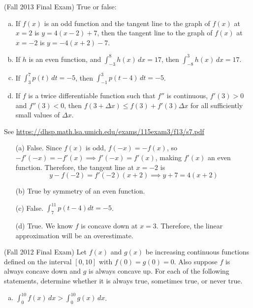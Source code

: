 \documentclass[11pt]{exam}
\begin{document}
\begin{questions}
\begin{solution}
\end{solution}
\question (Fall 2013 Final Exam) %
True or false:
\begin{enumerate}[(a)]
\item If $f(x)$ is an odd function and the tangent line to the graph of $f(x)$ at $x = 2$ is $y = 4(x-2)+7$, then the tangent line to the graph of $f(x)$ at $x = -2$ is $y = -4(x+2)-7$.
\item If $h$ is an even function, and $\displaystyle\int_{-3}^8 h(x) \, dx=17$, then $\int_{-8}^3 h(x) \, dx=17$.
\item If $\int_{3}^7 p(t) \, dt=-5$, then $\displaystyle\int_{-1}^3 p(t-4) \, dt=-5$.
\item If $f$ is a twice differentiable function such that $f''$ is continuous, $f'(3)>0$ and $f''(3)<0$, then $f(3 + \Delta x) \leqslant f(3) + f'(3) \Delta x$ for all sufficiently small values of $\Delta x$.
\end{enumerate}
\begin{solution}
  See \href{https://dhsp.math.lsa.umich.edu/exams/115exam3/f13/s7.pdf}{https://dhsp.math.lsa.umich.edu/exams/115exam3/f13/s7.pdf}
  \begin{enumerate}
    \item[(a)] False. Since \(f(x)\) is odd, \(f(-x) = -f(x)\), so
      \(-f'(-x) = -f'(x) \implies f'(-x) = f'(x)\), making \(f'(x)\)
      an even function. Therefore, the tangent line at \(x=-2\) is \[
        y-f(-2) = f'(-2)(x+2) \implies y+7 = 4(x+2)
      \]
   \item[(b)] True by symmetry of an even function.
   \item[(c)] False. \(\int_{7}^{11} p(t-4) dt = -5\). 
   \item[(d)] True. We know \(f\) is concave down at
     \(x=3\). Therefore, the linear approximation will be an overestimate.
  \end{enumerate}
\end{solution}
\question (Fall 2012 Final Exam)  %
Let $f(x)$ and $g(x)$ be increasing continuous functions defined on the interval $[0,10]$ with $f(0) = g(0) = 0$. Also suppose $f$ is always concave down and $g$ is always concave up. For each of the following statements, determine whether it is always true, sometimes true, or never true.
\begin{multicols}{2}
  \begin{enumerate}[(a)]
  \item
    $\displaystyle\int_{0}^{10} f(x) \, dx >
    \displaystyle\int_{0}^{10} g(x) \, dx$.

\end{enumerate}
\end{multicols}
\end{questions}
\end{document}
